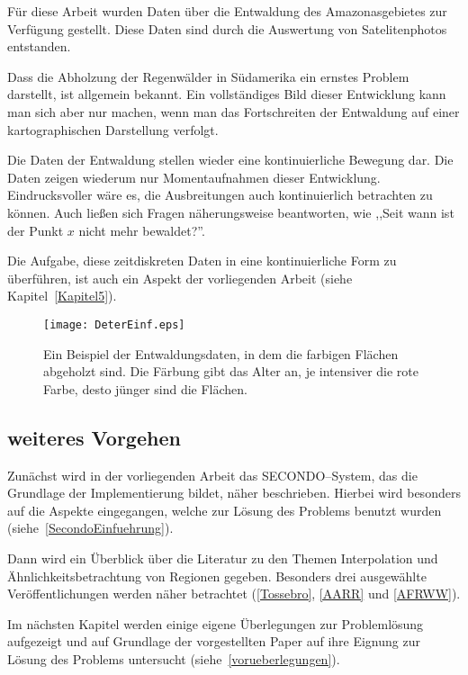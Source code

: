 Für diese Arbeit wurden Daten über die Entwaldung des Amazonasgebietes zur Verfügung gestellt.
Diese Daten sind durch die Auswertung von Satelitenphotos entstanden. 

Dass die Abholzung der Regenwälder in Südamerika ein ernstes Problem darstellt, ist allgemein bekannt. Ein vollständiges Bild dieser Entwicklung kann man sich aber nur machen, wenn man das Fortschreiten der Entwaldung auf einer kartographischen Darstellung verfolgt. 

Die Daten der Entwaldung stellen wieder eine kontinuierliche Bewegung dar. Die Daten zeigen wiederum nur Momentaufnahmen dieser Entwicklung. Eindrucksvoller wäre es, die Ausbreitungen auch kontinuierlich betrachten zu können. Auch ließen sich Fragen näherungsweise beantworten, wie ,,Seit wann ist der Punkt $x$ nicht mehr bewaldet?''.

Die Aufgabe, diese zeitdiskreten Daten in eine kontinuierliche Form zu überführen, ist auch ein Aspekt der vorliegenden Arbeit (siehe Kapitel~\vref{Kapitel5}).

\begin{figure}
	\centering
	\texttt{[image: DeterEinf.eps]}
	\caption[Ein Beispiel für Entwaldungsdaten]{Ein Beispiel der Entwaldungsdaten, in dem die farbigen Flächen abgeholzt sind. Die Färbung gibt das Alter an, je intensiver die rote Farbe, desto jünger sind die Flächen.}
	\label{fig:DeterEinfuehrung}
\end{figure}


\subsection*{weiteres Vorgehen}

Zunächst wird in der vorliegenden Arbeit das SECONDO--System, das die Grundlage der Implementierung bildet, näher  beschrieben. Hierbei wird besonders auf die Aspekte eingegangen, welche zur Lösung des Problems benutzt wurden (siehe~\vref{SecondoEinfuehrung}).

Dann wird ein Überblick über die Literatur zu den Themen Interpolation und Ähnlichkeitsbetrachtung von Regionen gegeben. Besonders drei ausgewählte Veröffentlichungen werden näher betrachtet (\vref{Tossebro}, \vref{AARR} und \vref{AFRWW}).

Im nächsten Kapitel werden einige eigene Überlegungen zur Problemlösung aufgezeigt und auf Grundlage der vorgestellten Paper auf ihre Eignung zur Lösung des Problems untersucht (siehe~\vref{vorueberlegungen}).
 
